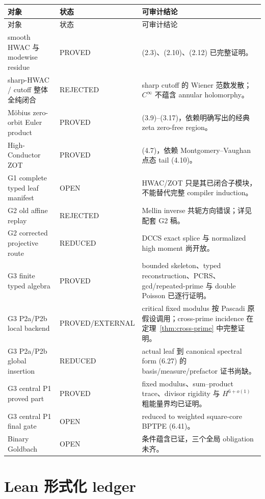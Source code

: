 \documentclass[11pt,a4paper]{ctexart}
\theoremstyle{definition}
\newcommand{\1}{\mathbf 1}
\newcommand{\OPEN}{\textcolor{red!70!black}{\textsf{OPEN}}}
\newcommand{\REDUCED}{\textcolor{orange!80!black}{\textsf{REDUCED}}}
\newcommand{\PROVED}{\textcolor{green!45!black}{\textsf{PROVED}}}
\newcommand{\EXTERNAL}{\textcolor{blue!70!black}{\textsf{EXTERNAL}}}
\newcommand{\REJECTED}{\textcolor{purple!75!black}{\textsf{REJECTED}}}
\begin{document}
\begin{longtable}{p{}p{}p{}}
\toprule
对象 & 状态 & 可审计结论\\ \midrule
\endfirsthead
\toprule 对象 & 状态 & 可审计结论\\ \midrule\endhead
smooth HWAC 与 modewise residue & \PROVED
& (2.3)、(2.10)、(2.12) 已完整证明。\\
sharp-HWAC / cutoff 整体全纯闭合 & \REJECTED
& sharp cutoff 的 Wiener 范数发散；$C^\infty$ 不蕴含 annular holomorphy。\\
Möbius zero-orbit Euler product & \PROVED
& (3.9)--(3.17)，依赖明确写出的经典 zeta zero-free region。\\
High-Conductor ZOT & \PROVED
& (4.7)，依赖 Montgomery--Vaughan 点态 tail (4.10)。\\
G1 complete typed leaf manifest & \OPEN
& HWAC/ZOT 只是其已闭合子模块，不能替代完整 compiler induction。\\
G2 old affine replay & \REJECTED
& Mellin inverse 共轭方向错误；详见配套 G2 稿。\\
G2 corrected projective route & \REDUCED
& DCCS exact splice 与 normalized high moment 尚开放。\\
G3 finite typed algebra & \PROVED
& bounded skeleton、typed reconstruction、PCRS、gcd/repeated-prime 与
double Poisson 已逐行证明。\\
G3 P2a/P2b local backend & \PROVED/\EXTERNAL
& critical fixed modulus 按 Pascadi 原假设调用；cross-prime incidence 在
定理~\ref{thm:cross-prime} 中完整证明。\\
G3 P2a/P2b global insertion & \REDUCED
& actual leaf 到 canonical spectral form (6.27) 的 basis/measure/prefactor
证书尚缺。\\
G3 central P1 proved part & \PROVED
& fixed modulus、sum--product trace、divisor rigidity 与 $H^{6+o(1)}$
粗能量界均已证明。\\
G3 central P1 final gate & \OPEN
& reduced to weighted square-core BPTPE (6.41)。\\
Binary Goldbach & \OPEN
& 条件蕴含已证，三个全局 obligation 未齐。\\
\bottomrule
\end{longtable}

\section{Lean 形式化 ledger}
\end{document}
